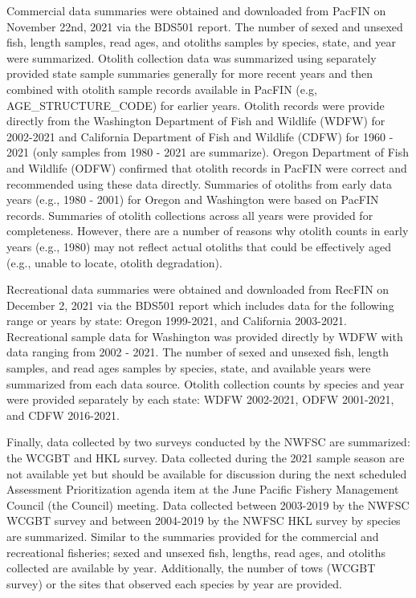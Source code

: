 \documentclass[11pt,
  english,
  letterpaper,
]{article}
\begin{document}
Commercial data summaries were obtained and downloaded from PacFIN on November 22nd, 2021 via the BDS501 report. The number of sexed and unsexed fish, length samples, read ages, and otoliths samples by species, state, and year were summarized. Otolith collection data was summarized using separately provided state sample summaries generally for more recent years and then combined with otolith sample records available in PacFIN (e.g, AGE\_STRUCTURE\_CODE) for earlier years. Otolith records were provide directly from the Washington Department of Fish and Wildlife (WDFW) for 2002-2021 and California Department of Fish and Wildlife (CDFW) for 1960 - 2021 (only samples from 1980 - 2021 are summarize). Oregon Department of Fish and Wildlife (ODFW) confirmed that otolith records in PacFIN were correct and recommended using these data directly. Summaries of otoliths from early data years (e.g., 1980 - 2001) for Oregon and Washington were based on PacFIN records. Summaries of otolith collections across all years were provided for completeness. However, there are a number of reasons why otolith counts in early years (e.g., 1980) may not reflect actual otoliths that could be effectively aged (e.g., unable to locate, otolith degradation).

\leavevmode\tagmcend\tagstructend\par


Recreational data summaries were obtained and downloaded from RecFIN on December 2, 2021 via the BDS501 report which includes data for the following range or years by state: Oregon 1999-2021, and California 2003-2021. Recreational sample data for Washington was provided directly by WDFW with data ranging from 2002 - 2021. The number of sexed and unsexed fish, length samples, and read ages samples by species, state, and available years were summarized from each data source. Otolith collection counts by species and year were provided separately by each state: WDFW 2002-2021, ODFW 2001-2021, and CDFW 2016-2021.

\leavevmode\tagmcend\tagstructend\par


Finally, data collected by two surveys conducted by the NWFSC are summarized: the WCGBT and HKL survey. Data collected during the 2021 sample season are not available yet but should be available for discussion during the next scheduled Assessment Prioritization agenda item at the June Pacific Fishery Management Council (the Council) meeting. Data collected between 2003-2019 by the NWFSC WCGBT survey and between 2004-2019 by the NWFSC HKL survey by species are summarized. Similar to the summaries provided for the commercial and recreational fisheries; sexed and unsexed fish, lengths, read ages, and otoliths collected are available by year. Additionally, the number of tows (WCGBT survey) or the sites that observed each species by year are provided.
\end{document}
